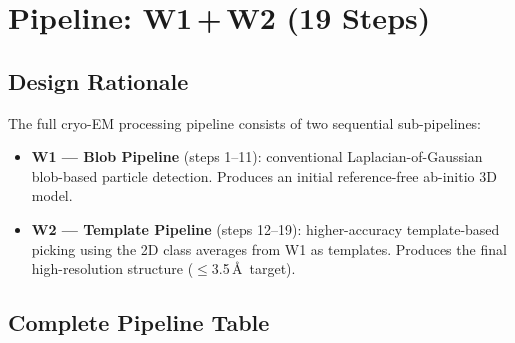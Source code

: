 \documentclass[12pt, a4paper]{article}
\begin{document}
\section{Pipeline: W1\,+\,W2 (19 Steps)}
\label{sec:pipeline}

\subsection{Design Rationale}

The full cryo-EM processing pipeline consists of two sequential sub-pipelines:

\begin{itemize}[leftmargin=1.6em, itemsep=3pt]
  \item \textbf{W1 --- Blob Pipeline} (steps 1--11): conventional
        Laplacian-of-Gaussian blob-based particle detection.
        Produces an initial reference-free ab-initio 3D model.
  \item \textbf{W2 --- Template Pipeline} (steps 12--19): higher-accuracy
        template-based picking using the 2D class averages from W1 as
        templates.  Produces the final high-resolution structure
        ($\leq$3.5\,\AA\ target).
\end{itemize}

\subsection{Complete Pipeline Table}
\end{document}
